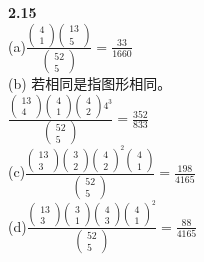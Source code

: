 \documentclass{book}%
\begin{document}
	{\bfseries 2.15}\\
	(a)$\frac{\begin{pmatrix}
			4\\1
		\end{pmatrix}\begin{pmatrix}
			13\\5
	\end{pmatrix}}{\begin{pmatrix}
			52\\5
	\end{pmatrix}}=\frac{33}{1660}$\\
	(b)
	若相同是指图形相同。\\
	$\frac{\begin{pmatrix}
			13\\4
		\end{pmatrix}\begin{pmatrix}
			4\\1
		\end{pmatrix}\begin{pmatrix}
			4\\2
		\end{pmatrix}4^{3}}{\begin{pmatrix}
			52\\5
	\end{pmatrix}}=\frac{352}{833}$\\
	(c)$\frac{\begin{pmatrix}
			13\\3
		\end{pmatrix}\begin{pmatrix}
			3\\2
		\end{pmatrix}{\begin{pmatrix}
				4\\2
		\end{pmatrix}}^{2}\begin{pmatrix}
			4\\1
	\end{pmatrix}}{\begin{pmatrix}
			52\\5
	\end{pmatrix}}=\frac{198}{4165}$\\
	(d)$\frac{\begin{pmatrix}
			13\\3
		\end{pmatrix}\begin{pmatrix}
			3\\1
		\end{pmatrix}\begin{pmatrix}
			4\\3
		\end{pmatrix}{\begin{pmatrix}
				4\\1
		\end{pmatrix}}^{2}}{\begin{pmatrix}
			52\\5
	\end{pmatrix}}=\frac{88}{4165}$\\
\end{document}
